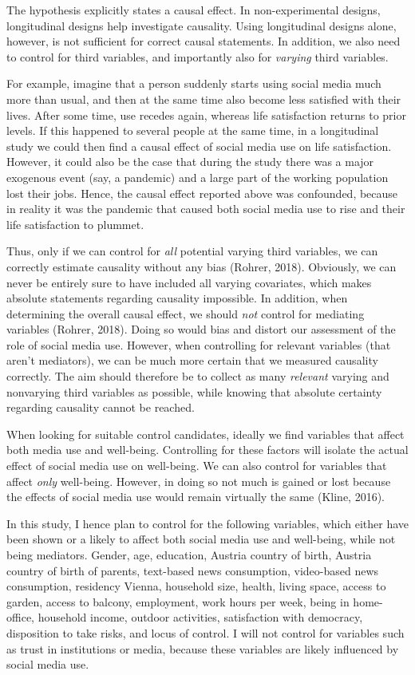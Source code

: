 \documentclass[
  english,
  man,mask,floatsintext]{apa6}
\begin{document}
The hypothesis explicitly states a causal effect.
In non-experimental designs, longitudinal designs help investigate causality.
Using longitudinal designs alone, however, is not sufficient for correct causal statements.
In addition, we also need to control for third variables, and importantly also for \emph{varying} third variables.

For example, imagine that a person suddenly starts using social media much more than usual, and then at the same time also become less satisfied with their lives.
After some time, use recedes again, whereas life satisfaction returns to prior levels.
If this happened to several people at the same time, in a longitudinal study we could then find a causal effect of social media use on life satisfaction.
However, it could also be the case that during the study there was a major exogenous event (say, a pandemic) and a large part of the working population lost their jobs.
Hence, the causal effect reported above was confounded, because in reality it was the pandemic that caused both social media use to rise and their life satisfaction to plummet.

Thus, only if we can control for \emph{all} potential varying third variables, we can correctly estimate causality without any bias (Rohrer, 2018).
Obviously, we can never be entirely sure to have included all varying covariates, which makes absolute statements regarding causality impossible.
In addition, when determining the overall causal effect, we should \emph{not} control for mediating variables (Rohrer, 2018).
Doing so would bias and distort our assessment of the role of social media use.
However, when controlling for relevant variables (that aren't mediators), we can be much more certain that we measured causality correctly.
The aim should therefore be to collect as many \emph{relevant} varying and nonvarying third variables as possible, while knowing that absolute certainty regarding causality cannot be reached.

When looking for suitable control candidates, ideally we find variables that affect both media use and well-being.
Controlling for these factors will isolate the actual effect of social media use on well-being.
We can also control for variables that affect \emph{only} well-being.
However, in doing so not much is gained or lost because the effects of social media use would remain virtually the same (Kline, 2016).

In this study, I hence plan to control for the following variables, which either have been shown or a likely to affect both social media use and well-being, while not being mediators.
Gender, age, education, Austria country of birth, Austria country of birth of parents, text-based news consumption, video-based news consumption, residency Vienna, household size, health, living space, access to garden, access to balcony, employment, work hours per week, being in home-office, household income, outdoor activities, satisfaction with democracy, disposition to take risks, and locus of control.
I will not control for variables such as trust in institutions or media, because these variables are likely influenced by social media use.
\end{document}
